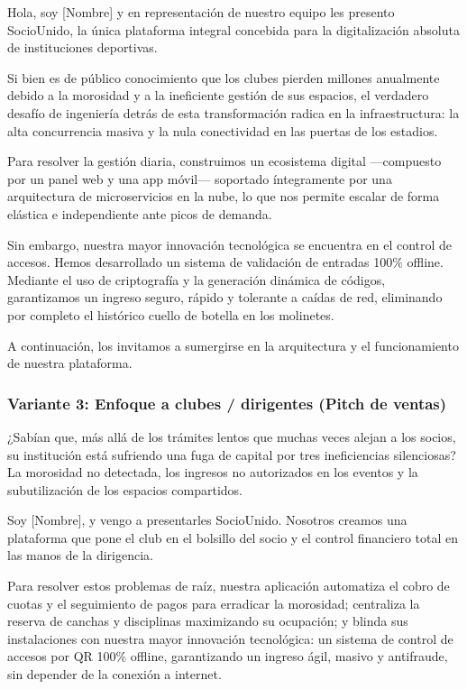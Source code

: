Hola, soy [Nombre] y en representación de nuestro equipo les presento SocioUnido, la única plataforma integral concebida para la digitalización absoluta de instituciones deportivas.

Si bien es de público conocimiento que los clubes pierden millones anualmente debido a la morosidad y a la ineficiente gestión de sus espacios, el verdadero desafío de ingeniería detrás de esta transformación radica en la infraestructura: la alta concurrencia masiva y la nula conectividad en las puertas de los estadios.

Para resolver la gestión diaria, construimos un ecosistema digital —compuesto por un panel web y una app móvil— soportado íntegramente por una arquitectura de microservicios en la nube, lo que nos permite escalar de forma elástica e independiente ante picos de demanda.

Sin embargo, nuestra mayor innovación tecnológica se encuentra en el control de accesos. Hemos desarrollado un sistema de validación de entradas 100\% offline. Mediante el uso de criptografía y la generación dinámica de códigos, garantizamos un ingreso seguro, rápido y tolerante a caídas de red, eliminando por completo el histórico cuello de botella en los molinetes.

A continuación, los invitamos a sumergirse en la arquitectura y el funcionamiento de nuestra plataforma.

\newpage

\subsubsection{Variante 3: Enfoque a clubes / dirigentes (Pitch de ventas)}

¿Sabían que, más allá de los trámites lentos que muchas veces alejan a los socios, su institución está sufriendo una fuga de capital por tres ineficiencias silenciosas? La morosidad no detectada, los ingresos no autorizados en los eventos y la subutilización de los espacios compartidos.

Soy [Nombre], y vengo a presentarles SocioUnido. Nosotros creamos una plataforma que pone el club en el bolsillo del socio y el control financiero total en las manos de la dirigencia. 

Para resolver estos problemas de raíz, nuestra aplicación automatiza el cobro de cuotas y el seguimiento de pagos para erradicar la morosidad; centraliza la reserva de canchas y disciplinas maximizando su ocupación; y blinda sus instalaciones con nuestra mayor innovación tecnológica: un sistema de control de accesos por QR 100\% offline, garantizando un ingreso ágil, masivo y antifraude, sin depender de la conexión a internet.

